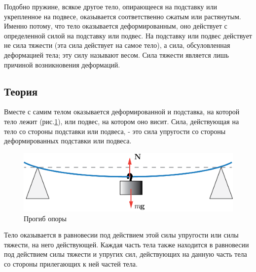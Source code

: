 \documentclass[All.tex]{subfiles}
\begin{document}
Подобно пружине, всякое другое тело, опирающееся на подставку или укрепленное на подвесе, оказывается соответственно сжатым или растянутым.
Именно потому, что тело оказывается деформированным, оно действует с определенной силой на подставку или подвес.
На подставку или подвес действует не сила тяжести (эта сила действует на самое тело), а сила, обсуловленная деформацией тела; эту силу называют весом.
Сила тяжести является лишь причиной возникновения деформаций.

\subsection*{\textcolor{PineGreen}{Теория}}

Вместе с самим телом оказывается деформированной и подставка, на которой тело лежит (рис.\ref{bend-2}), или подвес, на котором оно висит.
Сила, действующая на тело со стороны подставки или подвеса, - это сила упругости со стороны деформированных подставки или подвеса.
\begin{figure}[H] 
	\centering 	
	\includegraphics[width=0.75\linewidth]{bend-2.png}
	\caption{Прогиб опоры}
	\label{bend-2}
\end{figure}

Тело оказывается в равновесии под действием этой силы упругости или силы тяжести, на него действующей.
Каждая часть тела также находится в равновесии под действием силы тяжести и упругих сил, действующих на данную часть тела со стороны прилегающих к ней частей тела.
\end{document}
